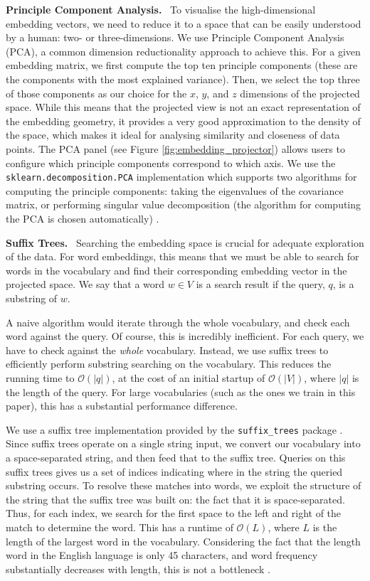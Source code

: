 \documentclass{paper}
\newcommand{\inlineSection}[1]{\vspace{0.5em}\noindent\textbf{#1.}~}
\begin{document}
\inlineSection{Principle Component Analysis} To visualise the high-dimensional embedding vectors, we need to reduce it to a space that can be easily understood by a human: two- or three-dimensions. We use Principle Component Analysis (PCA), a common dimension reductionality approach to achieve this. For a given embedding matrix, we first compute the top ten principle components (these are the components with the most explained variance). Then, we select the top three of those components as our choice for the $x$, $y$, and $z$ dimensions of the projected space. While this means that the projected view is not an exact representation of the embedding geometry, it provides a very good approximation to the density of the space, which makes it ideal for analysing similarity and closeness of data points. The PCA panel (see Figure \ref{fig:embedding_projector}) allows users to configure which principle components correspond to which axis. We use the \texttt{sklearn.decomposition.PCA} implementation which supports two algorithms for computing the principle components: taking the eigenvalues of the covariance matrix, or performing singular value decomposition (the algorithm for computing the PCA is chosen automatically) \cite{scikit-learn}.

\inlineSection{Suffix Trees} Searching the embedding space is crucial for adequate exploration of the data. For word embeddings, this means that we must be able to search for words in the vocabulary and find their corresponding embedding vector in the projected space. We say that a word $w\in V$ is a search result if the query, $q$, is a substring of $w$. 

A naive algorithm would iterate through the whole vocabulary, and check each word against the query. Of course, this is incredibly inefficient. For each query, we have to check against the \textit{whole} vocabulary. Instead, we use suffix trees to efficiently perform substring searching on the vocabulary. This reduces the running time to $\mathcal{O}(|q|)$, at the cost of an initial startup of $\mathcal{O}(|V|)$, where $|q|$ is the length of the query. For large vocabularies (such as the ones we train in this paper), this has a substantial performance difference.

We use a suffix tree implementation provided by the \texttt{suffix\_trees} package \cite{suffix_trees_package}. Since suffix trees operate on a single string input, we convert our vocabulary into a space-separated string, and then feed that to the suffix tree. Queries on this suffix trees gives us a set of indices indicating where in the string the queried substring occurs. To resolve these matches into words, we exploit the structure of the string that the suffix tree was built on: the fact that it is space-separated. Thus, for each index, we search for the first space to the left and right of the match to determine the word. This has a runtime of $\mathcal{O}(L)$, where $L$ is the length of the largest word in the vocabulary. Considering the fact that the length word in the English language is only 45 characters, and word frequency substantially decreases with length, this is not a bottleneck \cite{wiki:longest_words, smith2012distinct}.
\end{document}
